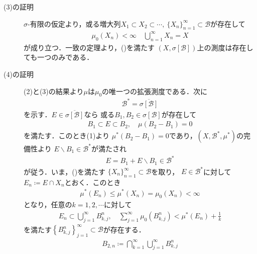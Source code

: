 \begin{prf}
\begin{description}
				\item[(3)の証明]
					$\sigma$-有限の仮定より，或る増大列$X_1 \subset X_2 \subset \cdots
					,\ \{X_n\}_{n=1}^\infty \subset \mathcal{B}$が存在して
					\begin{align}
						\mu_0 (X_n) < \infty \quad \bigcup_{n=1}^\infty X_n = X
						\label{eq:appendix_finite_additive_measure_expansion_3}
					\end{align}
					が成り立つ．一致の定理より，()を満たす
					$\left( X,\sigma[\mathcal{B}] \right)$上の測度は存在しても一つのみである．
					
				\item[(4)の証明]
					(2)と(3)の結果より$\mu$は$\mu_0$の唯一つの拡張測度である．次に
					\begin{align}
						\mathcal{B}^* = \overline{\sigma[\mathcal{B}]}
						\label{eq:appendix_finite_additive_measure_expansion_4}
					\end{align}
					を示す．$E \in \overline{\sigma[\mathcal{B}]}$なら
					或る$B_1,B_2 \in \sigma[\mathcal{B}]$が存在して
					\begin{align}
						B_1 \subset E \subset B_2, \quad \mu(B_2 - B_1) = 0
					\end{align}
					を満たす．このとき(1)より
					$\mu^*(B_2 - B_1) = 0$であり，$\left( X,\mathcal{B}^*,\mu^* \right)$の完備性より
					$E \backslash B_1 \in \mathcal{B}^*$が満たされ
					\begin{align}
						E = B_1 + E \backslash B_1 \in \mathcal{B}^*
					\end{align}
					が従う．いま，()を満たす
					$\{X_n\}_{n=1}^\infty \subset \mathcal{B}$を取り，
					$E \in \mathcal{B}^*$に対して$E_n \coloneqq E \cap X_n$とおく．このとき
					\begin{align}
						\mu^*(E_n) \leq \mu^*(X_n) = \mu_0(X_n) < \infty
					\end{align}
					となり，任意の$k = 1,2,\cdots$に対して
					\begin{align}
						E_n \subset \bigcup_{j=1}^\infty B^n_{k,j},
						\quad
						\sum_{j=1}^\infty \mu_0\left( B^n_{k,j} \right)
						< \mu^*(E_n) + \frac{1}{k}
					\end{align}
					を満たす$\left\{B^n_{k,j}\right\}_{j=1}^\infty \subset \mathcal{B}$が存在する．
					\begin{align}
						B_{2,n} \coloneqq \bigcap_{k=1}^\infty \bigcup_{j=1}^\infty B^n_{k,j}
					\end{align}

\end{description}
\end{prf}
